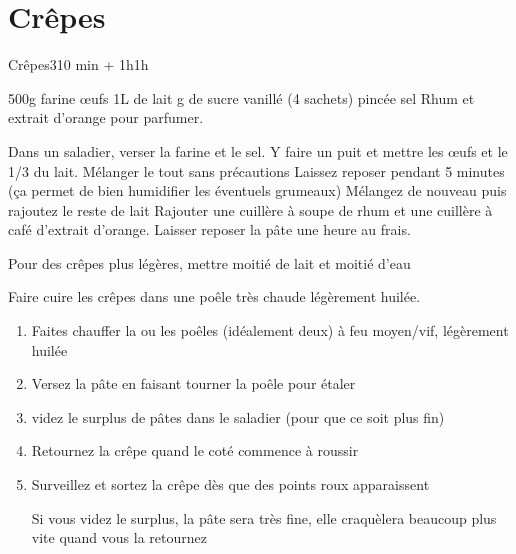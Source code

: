 {\section{Crêpes}
\begin{recette}{Crêpes}{3}{10 min + 1h}{1h}
\begin{ingredients}
\ingredient 500g farine
 œufs
\ingredient 1L de lait
 g de sucre vanillé (4 sachets)
 pincée sel
\ingredient Rhum et extrait d'orange pour parfumer.
\end{ingredients}


\begin{preparation}
\etape Dans un saladier, verser la farine et le sel.
\etape Y faire un puit et mettre les œufs et le 1/3 du lait. Mélanger le tout sans précautions
\etape Laissez reposer pendant 5 minutes (ça permet de bien humidifier les éventuels grumeaux)
\etape Mélangez de nouveau puis rajoutez le reste de lait
\etape Rajouter une cuillère à soupe de rhum et une cuillère à café d'extrait d'orange.
\etape Laisser reposer la pâte une heure au frais.
\end{preparation}

\begin{remarque}
Pour des crêpes plus légères, mettre moitié de lait et moitié d'eau
\end{remarque}

\begin{cuisson}
Faire cuire les crêpes dans une poêle très chaude légèrement huilée. 

\begin{enumerate}
 \item Faites chauffer la ou les poêles (idéalement deux) à feu moyen/vif, légèrement huilée
 \item Versez la pâte en faisant tourner la poêle pour étaler
 \item videz le surplus de pâtes dans le saladier (pour que ce soit plus fin)
 \item Retournez la crêpe quand le coté commence à roussir
 \item Surveillez et sortez la crêpe dès que des points roux apparaissent
 \begin{remarque}
  Si vous videz le surplus, la pâte sera très fine, elle craquèlera beaucoup plus vite quand vous la retournez
 \end{remarque}

\end{enumerate}
\end{cuisson}
\end{recette}

}
